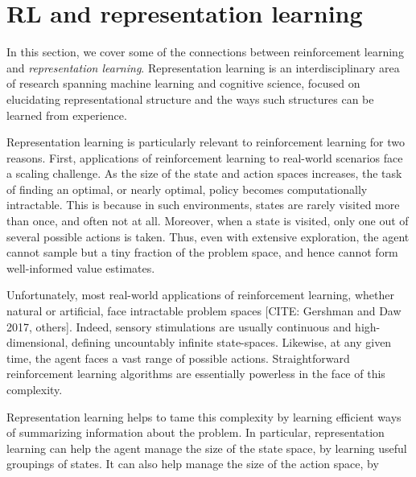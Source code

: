 \section{RL and representation learning}

In this section, we cover some of the connections between reinforcement learning and \emph{representation learning}.
Representation learning is an interdisciplinary area of research spanning machine learning and cognitive science, focused on elucidating representational structure and the ways such structures can be learned from experience.

Representation learning is particularly relevant to reinforcement learning for two reasons.
First, applications of reinforcement learning to real-world scenarios face a scaling challenge.
As the size of the state and action spaces increases, the task of finding an optimal, or nearly optimal, policy becomes computationally intractable.
This is because in such environments, states are rarely visited more than once, and often not at all.
Moreover, when a state is visited, only one out of several possible actions is taken.
Thus, even with extensive exploration, the agent cannot sample but a tiny fraction of the problem space, and hence cannot form well-informed value estimates.

Unfortunately, most real-world applications of reinforcement learning, whether natural or artificial, face intractable problem spaces [CITE: Gershman and Daw 2017, others].
Indeed, sensory stimulations are usually continuous and high-dimensional, defining uncountably infinite state-spaces.
Likewise, at any given time, the agent faces a vast range of possible actions.
Straightforward reinforcement learning algorithms are essentially powerless in the face of this complexity.

Representation learning helps to tame this complexity by learning efficient ways of summarizing information about the problem.
In particular, representation learning can help the agent manage the size of the state space, by learning useful groupings of states.
It can also help manage the size of the action space, by 
